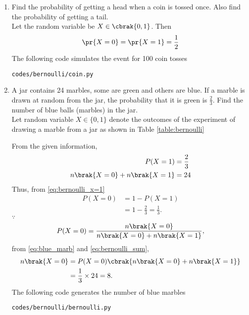 \renewcommand{\theequation}{\theenumi}
\renewcommand{\thefigure}{\theenumi}
\begin{enumerate}[label=\thesection.\arabic*.,ref=\thesection.\theenumi]
%
\item Find the probability of getting a head when a coin is tossed once. Also
find the probability of getting a tail.
\\
\solution  
Let the random variable be $X\in \cbrak{0,1}$.  Then
\begin{align}
\pr{X=0}=\pr{X=1}=\frac{1}{2}
\end{align}
The following code simulates the event for 100 coin tosses
\begin{lstlisting}
codes/bernoulli/coin.py
\end{lstlisting}
\item A jar contains 24 marbles, some are green and others are blue. If a marble is drawn at random from the jar, the probability that it is green is
$\frac{2}{3}$. Find the number of blue balls (marbles) in the jar.\\
\solution Let random variable $X\in\{0,1\}$ denote the outcomes of the experiment of drawing a marble from a jar as shown in Table \ref{table:bernoulli}
%
\begin{table}
\centering
\caption{}

\label{table:bernoulli}
\end{table}
%
From the given information,
\begin{align}
\label{eq:bernoulli_x=1}
P(X=1)&=\frac{2}{3}
\\
n\brak{X=0}+
n\brak{X=1} &= 24
\label{eq:bernoulli_sum}
\end{align}
%
Thus, from \eqref{eq:bernoulli_x=1} 
\begin{align}
 P(X=0)&=1-P(X=1)\nonumber\\
 &=1-\frac{2}{3}=\frac{1}{3}.
\end{align}
%
$\because$
\begin{equation}
 P(X=0)=\frac{n\brak{X=0} }{n\brak{X=0}+
n\brak{X=1}},
 \label{eq:blue_marb}
\end{equation} 
from \eqref{eq:blue_marb} and \eqref{eq:bernoulli_sum},
\begin{align}
n\brak{X=0}  &=P(X=0)\cbrak{n\brak{X=0}+n\brak{X=1}}
\\
&=\frac{1}{3}\times 24=8.
\label{eq:green_marble}
\end{align}
% 
The following code generates the number of blue marbles 
\begin{lstlisting}
codes/bernoulli/bernoulli.py
\end{lstlisting}


\end{enumerate}


